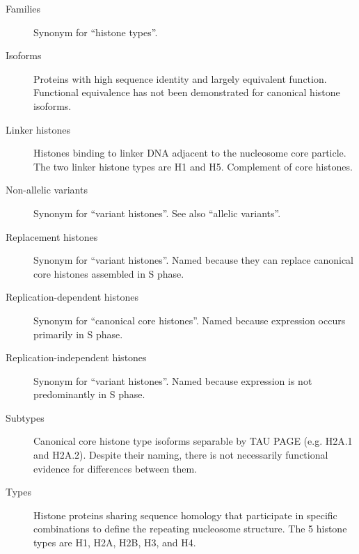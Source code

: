 {\begin{shaded}
\begin{description}
        \item[Families] \hfill \newline
        Synonym for ``histone types''.

        \item[Isoforms] \hfill \newline
        Proteins with high sequence identity and largely equivalent function.
        Functional equivalence has not been demonstrated for canonical histone isoforms.

        \item[Linker histones] \hfill \newline
        Histones binding to linker DNA adjacent to the nucleosome core particle.
        The two linker histone types are H1 and H5. Complement of core histones.

        \item[Non-allelic variants] \hfill \newline
        Synonym for ``variant histones''. See also ``allelic variants''.

        \item[Replacement histones] \hfill \newline
        Synonym for ``variant histones''.
        Named because they can replace canonical core histones assembled in S phase.

        \item[Replication-dependent histones] \hfill \newline
        Synonym for ``canonical core histones''.
        Named because expression occurs primarily in S phase.

        \item[Replication-independent histones] \hfill \newline
        Synonym for ``variant histones''.
        Named because expression is not predominantly in S phase.

        \item[Subtypes] \hfill \newline
        Canonical core histone type isoforms separable by TAU PAGE
        (e.g. H2A.1 and H2A.2).  Despite their naming, there is not necessarily functional evidence
        for differences between them.

        \item[Types] \hfill \newline
        Histone proteins sharing sequence homology
        that participate in specific combinations to define the repeating nucleosome structure.
        The 5 histone types are H1, H2A, H2B, H3, and H4.


\end{description}
\end{shaded}}
